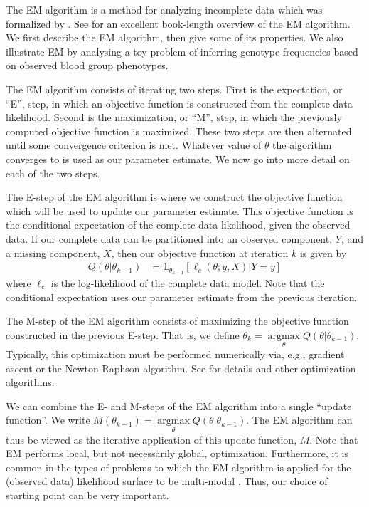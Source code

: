 \documentclass[11pt, oneside]{article}   	%
\newcommand{\bE}{\mathbb{E}}
\DeclareMathOperator*{\argmax}{argmax}
\begin{document}
The EM algorithm is a method for analyzing incomplete data which was formalized by \citet{Dem77}. See \citet{McL08} for an excellent book-length overview of the EM algorithm. We first describe the EM algorithm, then give some of its properties. We also illustrate EM by analysing a toy problem of inferring genotype frequencies based on observed blood group phenotypes.

The EM algorithm consists of iterating two steps. First is the expectation, or ``E'', step, in which an objective function is constructed from the complete data likelihood. Second is the maximization, or ``M'', step, in which the previously computed objective function is maximized. These two steps are then alternated until some convergence criterion is met. Whatever value of $\theta$ the algorithm converges to is used as our parameter estimate. We now go into more detail on each of the two steps.

The E-step of the EM algorithm is where we construct the objective function which will be used to update our parameter estimate. This objective function is the conditional expectation of the complete data likelihood, given the observed data. If our complete data can be partitioned into an observed component, $Y$, and a missing component, $X$, then our objective function at iteration $k$ is given by
%
\begin{align}
    Q(\theta|\theta_{k-1}) & = \bE_{\theta_{k-1}}[\ell_c(\theta; y, X) | Y=y]
\end{align}
%
where $\ell_c$ is the log-likelihood of the complete data model. Note that the conditional expectation uses our parameter estimate from the previous iteration.

The M-step of the EM algorithm consists of maximizing the objective function constructed in the previous E-step. That is, we define $\theta_k = \argmax\limits_\theta Q(\theta|\theta_{k-1})$. Typically, this optimization must be performed numerically via, e.g., gradient ascent or the Newton-Raphson algorithm. See \citet{Noc06} for details and other optimization algorithms. 

We can combine the E- and M-steps of the EM algorithm into a single ``update function''. We write $M(\theta_{k-1}) = \argmax\limits_\theta Q(\theta|\theta_{k-1})$. The EM algorithm can thus be viewed as the iterative application of this update function, $M$. Note that EM performs local, but not necessarily global, optimization. Furthermore, it is common in the types of problems to which the EM algorithm is applied for the (observed data) likelihood surface to be multi-modal \citep{McL08}. Thus, our choice of starting point can be very important.
\end{document}
